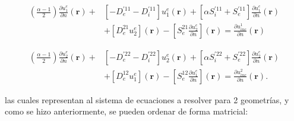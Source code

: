 \documentclass[12pt,letterpaper]{article}
\numberwithin{equation}{section}
\begin{document}
\begin{equation}
\begin{split}
(\frac{\alpha - 1}{2})\frac{\partial u^{e}_1}{\partial n}(\textbf{r}) + &\left[-D_{e}^{'11} - D_{i}^{'11}\right] u^{e}_1(\textbf{r}) + \left[\alpha S_{i}^{'11} + S_{e}^{'11}\right]\frac{\partial u^{e}_1}{\partial n}(\textbf{r})\\
&+ \left[D_{e}^{21} u^{e}_2\right](\textbf{r}) - \left[S_{e}^{21} \frac{\partial u^{e}_2}{\partial n}\right](\textbf{r}) = \frac{\partial u_{inc}^1}{\partial n}(\textbf{r}) 
\end{split}
\label{eq: multi_trans_deriv_1}		
\end{equation}

\begin{equation}
\begin{split}
(\frac{\alpha - 1}{2})\frac{\partial u^{e}_2}{\partial n}(\textbf{r}) + &\left[-D_{e}^{'22} - D_{i}^{'22}\right] u^{e}_2(\textbf{r}) + \left[\alpha S_{i}^{'22} + S_{e}^{'22}\right]\frac{\partial u^{e}_2}{\partial n}(\textbf{r})\\
&+ \left[D_{e}^{12} u^{e}_1\right](\textbf{r}) - \left[S_{e}^{12} \frac{\partial u^{e}_1}{\partial n}\right](\textbf{r}) = \frac{\partial u_{inc}^2}{\partial n}(\textbf{r}). 
\end{split}
\label{eq: multi_trans_deriv_2}		
\end{equation}

\noindent las cuales representan al sistema de ecuaciones a resolver para 2 geometrías, y como se hizo anteriormente, se pueden ordenar de forma matricial:
\end{document}
